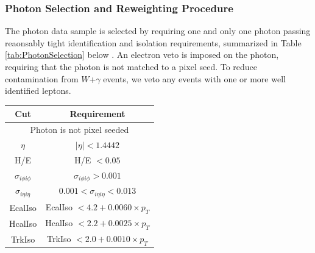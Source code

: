 \subsubsection{Photon Selection and Reweighting Procedure}
The photon data sample is selected by requiring one and only one photon passing reaonsably tight
identification and isolation requirements, summarized in Table \ref{tab:PhotonSelection} below 
\cite{MITHggNote}. 
An electron veto is imposed on the photon, requiring that the photon is not matched to a pixel seed.
To reduce contamination from $W$+$\gamma$ events, we veto any events with one or 
more well identified leptons.


\begin{table}[!ht]
\begin{center}
\begin{tabular}{|c|c|} 
\hline
Cut           & Requirement                                                                           \\
\hline
\multicolumn{2}{|c|}{Photon is not pixel seeded}                                                      \\
\hline
$\eta$        & $|\eta| < 1.4442$                                                                     \\ 
\hline
H/E           & H/E $< 0.05$                                                                          \\
$\sigma_{i\phi i\phi}$ & $\sigma_{i\phi i\phi} > 0.001$                                           \\
$\sigma_{i\eta i\eta}$ & $0.001 < \sigma_{i\eta i\eta} < 0.013$                                   \\
\hline
EcalIso       & EcalIso $<  4.2 + 0.0060\times p_{T}$   \\
HcalIso       & HcalIso $<  2.2 + 0.0025\times p_{T}$  \\
TrkIso        & TrkIso  $<  2.0 + 0.0010\times p_{T}$     \\
\hline

\end{tabular}
\end{center}
\end{table}
